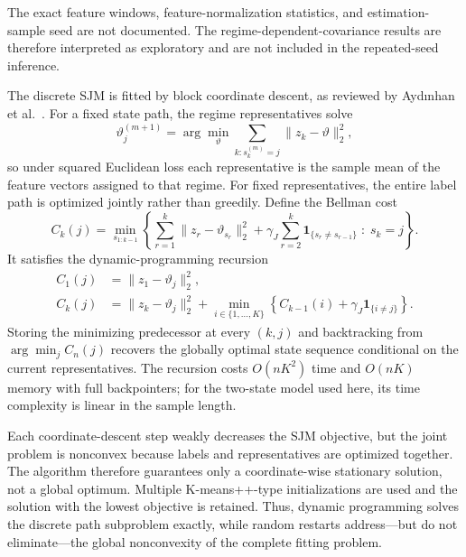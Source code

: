 \documentclass[a4paper,10pt]{article}
\begin{document}
The exact feature windows, feature-normalization statistics, and
estimation-sample seed are not documented. The regime-dependent-covariance
results are therefore interpreted as exploratory and are not included in
the repeated-seed inference.

The discrete SJM is fitted by block coordinate descent, as reviewed by Ayd{\i}nhan et al.~\cite{aydinhan2024}. For a fixed state path, the regime representatives solve
\begin{equation}
\vartheta_j^{(m+1)}
=\arg\min_{\vartheta}
\sum_{k:s_k^{(m)}=j}\|z_k-\vartheta\|_2^2,
\end{equation}
so under squared Euclidean loss each representative is the sample mean of the feature vectors assigned to that regime. For fixed representatives, the entire label path is optimized jointly rather than greedily. Define the Bellman cost
\begin{equation}
C_k(j)=\min_{s_{1:k-1}}
\left\{
\sum_{r=1}^{k}\|z_r-\vartheta_{s_r}\|_2^2
+\gamma_J\sum_{r=2}^{k}\bm{1}_{\{s_r\ne s_{r-1}\}}
\;:\;s_k=j
\right\}.
\end{equation}
It satisfies the dynamic-programming recursion
\begin{align}
C_1(j)&=\|z_1-\vartheta_j\|_2^2,\\
C_k(j)&=\|z_k-\vartheta_j\|_2^2
+\min_{i\in\{1,\ldots,K\}}
\left\{C_{k-1}(i)+\gamma_J\bm{1}_{\{i\ne j\}}\right\}.
\label{eq:sjm_dp}
\end{align}
Storing the minimizing predecessor at every $(k,j)$ and backtracking from $\arg\min_j C_n(j)$ recovers the globally optimal state sequence conditional on the current representatives. The recursion costs $O(nK^2)$ time and $O(nK)$ memory with full backpointers; for the two-state model used here, its time complexity is linear in the sample length.

Each coordinate-descent step weakly decreases the SJM objective, but the joint problem is nonconvex because labels and representatives are optimized together. The algorithm therefore guarantees only a coordinate-wise stationary solution, not a global optimum. Multiple K-means++-type initializations are used and the solution with the lowest objective is retained. Thus, dynamic programming solves the discrete path subproblem exactly, while random restarts address---but do not eliminate---the global nonconvexity of the complete fitting problem.
\end{document}
